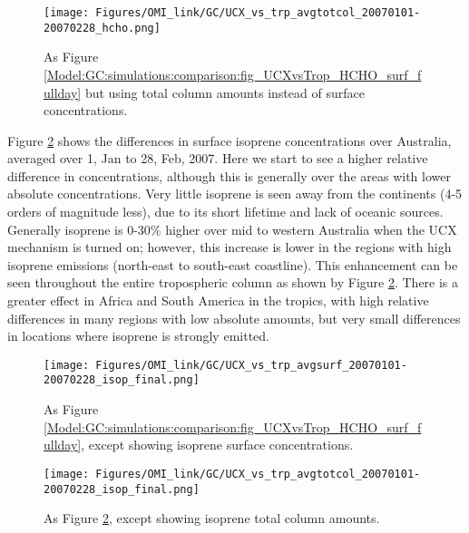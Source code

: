       \begin{figure}
        \texttt{[image: Figures/OMI\_link/GC/UCX\_vs\_trp\_avgtotcol\_20070101-20070228\_hcho.png]}
        \caption{%
          As Figure \ref{Model:GC:simulations:comparison:fig_UCXvsTrop_HCHO_surf_fullday} but using total column amounts instead of surface concentrations.
        }
        \label{Model:GC:simulations:comparison:fig_UCXvsTrop_HCHO_totcol_fullday}
      \end{figure}
      
      
      Figure \ref{Model:GC:simulations:comparison:fig_UCXvsTrop_isop_surf_fullday} shows the differences in surface isoprene concentrations over Australia, averaged over 1, Jan to 28, Feb, 2007.
      Here we start to see a higher relative difference in concentrations, although this is generally over the areas with lower absolute concentrations. 
      Very little isoprene is seen away from the continents (4-5 orders of magnitude less), due to its short lifetime and  lack of oceanic sources.
      Generally isoprene is 0-30\% higher over mid to western Australia when the UCX mechanism is turned on; however, this increase is lower in the regions with high isoprene emissions (north-east to south-east coastline).
      This enhancement can be seen throughout the entire tropospheric column as shown by Figure \ref{Model:GC:simulations:comparison:fig_UCXvsTrop_isop_surf_fullday}.
      There is a greater effect in Africa and South America in the tropics, with high relative differences in many regions with low absolute amounts, but very small differences in locations where isoprene is strongly emitted.
      
      \begin{figure}
        \texttt{[image: Figures/OMI\_link/GC/UCX\_vs\_trp\_avgsurf\_20070101-20070228\_isop\_final.png]}
        \caption{ %
          As Figure \ref{Model:GC:simulations:comparison:fig_UCXvsTrop_HCHO_surf_fullday}, except showing isoprene surface concentrations. 
        }      
        \label{Model:GC:simulations:comparison:fig_UCXvsTrop_isop_surf_fullday}
      \end{figure}
      \begin{figure}
        \texttt{[image: Figures/OMI\_link/GC/UCX\_vs\_trp\_avgtotcol\_20070101-20070228\_isop\_final.png]}
        \caption{ %
          As Figure \ref{Model:GC:simulations:comparison:fig_UCXvsTrop_isop_surf_fullday}, except showing isoprene total column amounts. 
        }      
        \label{Model:GC:simulations:comparison:fig_UCXvsTrop_isop_totcol_fullday}
      \end{figure}
      
